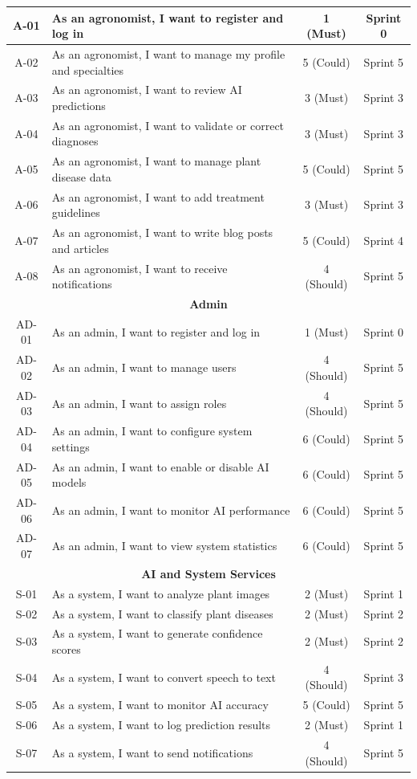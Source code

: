 \documentclass[12pt]{article}
\begin{document}
\begin{table}[H]
\begin{tabular}{|c|p{11cm}|c|c|}
\hline
A-01 & As an agronomist, I want to register and log in & 1 (Must) & Sprint 0 \\
\hline
A-02 & As an agronomist, I want to manage my profile and specialties & 5 (Could) & Sprint 5 \\
\hline
A-03 & As an agronomist, I want to review AI predictions & 3 (Must) & Sprint 3 \\
\hline
A-04 & As an agronomist, I want to validate or correct diagnoses & 3 (Must) & Sprint 3 \\
\hline
A-05 & As an agronomist, I want to manage plant disease data & 5 (Could) & Sprint 5 \\
\hline
A-06 & As an agronomist, I want to add treatment guidelines & 3 (Must) & Sprint 3 \\
\hline
A-07 & As an agronomist, I want to write blog posts and articles & 5 (Could) & Sprint 4 \\
\hline
A-08 & As an agronomist, I want to receive notifications & 4 (Should) & Sprint 5 \\
\hline
\multicolumn{4}{|c|}{\textbf{Admin}} \\
\hline
AD-01 & As an admin, I want to register and log in & 1 (Must) & Sprint 0 \\
\hline
AD-02 & As an admin, I want to manage users & 4 (Should) & Sprint 5 \\
\hline
AD-03 & As an admin, I want to assign roles & 4 (Should) & Sprint 5 \\
\hline
AD-04 & As an admin, I want to configure system settings & 6 (Could) & Sprint 5 \\
\hline
AD-05 & As an admin, I want to enable or disable AI models & 6 (Could) & Sprint 5 \\
\hline
AD-06 & As an admin, I want to monitor AI performance & 6 (Could) & Sprint 5 \\
\hline
AD-07 & As an admin, I want to view system statistics & 6 (Could) & Sprint 5 \\
\hline
\multicolumn{4}{|c|}{\textbf{AI and System Services}} \\
\hline
S-01 & As a system, I want to analyze plant images & 2 (Must) & Sprint 1 \\
\hline
S-02 & As a system, I want to classify plant diseases & 2 (Must) & Sprint 2 \\
\hline
S-03 & As a system, I want to generate confidence scores & 2 (Must) & Sprint 2 \\
\hline
S-04 & As a system, I want to convert speech to text & 4 (Should) & Sprint 3 \\
\hline
S-05 & As a system, I want to monitor AI accuracy & 5 (Could) & Sprint 5 \\
\hline
S-06 & As a system, I want to log prediction results & 2 (Must) & Sprint 1 \\
\hline
S-07 & As a system, I want to send notifications & 4 (Should) & Sprint 5 \\
\hline
\end{tabular}
\end{table}
\end{document}
